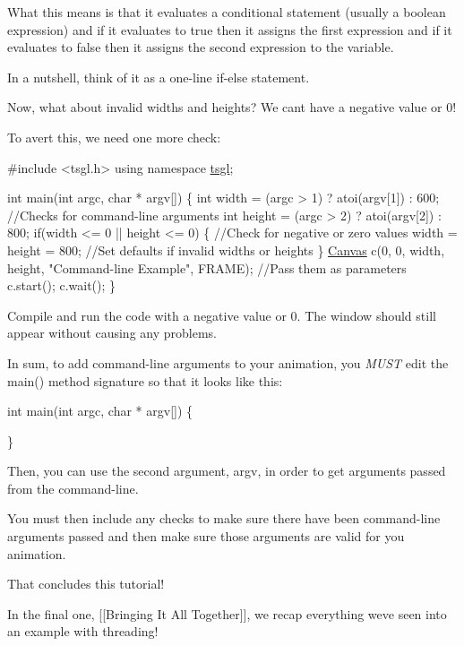 What this means is that it evaluates a conditional statement (usually a boolean expression) and if it evaluates to true then it assigns the first expression and if it evaluates to false then it assigns the second expression to the variable.

In a nutshell, think of it as a one-\/line if-\/else statement.

Now, what about invalid widths and heights? We can\textquotesingle{}t have a negative value or 0!

To avert this, we need one more check\+:


\begin{DoxyCode}
\textcolor{preprocessor}{#include <tsgl.h>}
\textcolor{keyword}{using namespace }\hyperlink{namespacetsgl}{tsgl};

\textcolor{keywordtype}{int} main(\textcolor{keywordtype}{int} argc, \textcolor{keywordtype}{char} * argv[]) \{
  \textcolor{keywordtype}{int} width = (argc > 1) ? atoi(argv[1]) : 600;  \textcolor{comment}{//Checks for command-line arguments}
  \textcolor{keywordtype}{int} height = (argc > 2) ? atoi(argv[2]) : 800;
  \textcolor{keywordflow}{if}(width <= 0 || height <= 0) \{  \textcolor{comment}{//Check for negative or zero values}
    width = height = 800;  \textcolor{comment}{//Set defaults if invalid widths or heights}
  \}
  \hyperlink{classtsgl_1_1_canvas}{Canvas} c(0, 0, width, height, \textcolor{stringliteral}{"Command-line Example"}, FRAME);  \textcolor{comment}{//Pass them as parameters}
  c.start();
  c.wait();
\}
\end{DoxyCode}


Compile and run the code with a negative value or 0. The window should still appear without causing any problems.

In sum, to add command-\/line arguments to your animation, you {\itshape M\+U\+S\+T} edit the main() method signature so that it looks like this\+:


\begin{DoxyCode}
\textcolor{keywordtype}{int} main(\textcolor{keywordtype}{int} argc, \textcolor{keywordtype}{char} * argv[]) \{

\}
\end{DoxyCode}


Then, you can use the second argument, {\ttfamily argv}, in order to get arguments passed from the command-\/line.

You must then include any checks to make sure there have been command-\/line arguments passed and then make sure those arguments are valid for you animation.

That concludes this tutorial!

In the final one, \mbox{[}\mbox{[}Bringing It All Together\mbox{]}\mbox{]}, we recap everything we\textquotesingle{}ve seen into an example with threading! 